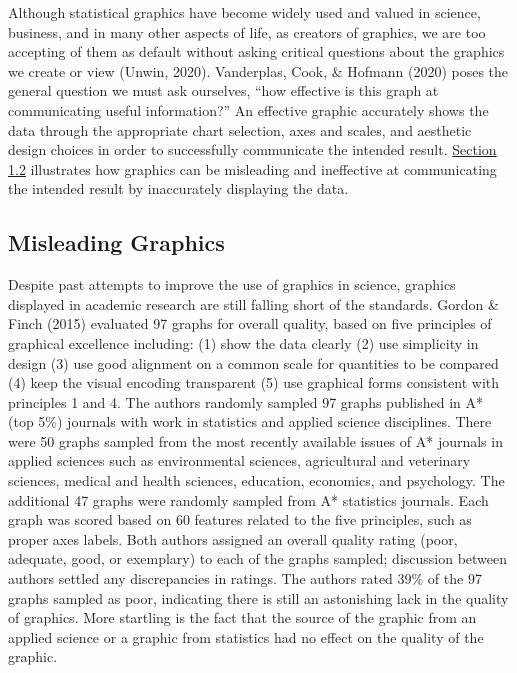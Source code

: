 \documentclass[print]{nuthesis}
\begin{document}
Although statistical graphics have become widely used and valued in science, business, and in many other aspects of life, as creators of graphics, we are too accepting of them as default without asking critical questions about the graphics we create or view (Unwin, 2020). 
Vanderplas, Cook, \& Hofmann (2020) poses the general question we must ask ourselves, ``how effective is this graph at communicating useful information?''
An effective graphic accurately shows the data through the appropriate chart selection, axes and scales, and aesthetic design choices in order to successfully communicate the intended result.
\protect\hyperlink{misleading-graphics}{Section 1.2} illustrates how graphics can be misleading and ineffective at communicating the intended result by inaccurately displaying the data.

\hypertarget{misleading-graphics}{%
\subsection{Misleading Graphics}\label{misleading-graphics}}

Despite past attempts to improve the use of graphics in science, graphics displayed in academic research are still falling short of the standards. Gordon \& Finch (2015) evaluated 97 graphs for overall quality, based on five principles of graphical excellence including: (1) show the data clearly (2) use simplicity in design (3) use good alignment on a common scale for quantities to be compared (4) keep the visual encoding transparent (5) use graphical forms consistent with principles 1 and 4.
The authors randomly sampled 97 graphs published in A* (top 5\%) journals with work in statistics and applied science disciplines.
There were 50 graphs sampled from the most recently available issues of A* journals in applied sciences such as environmental sciences, agricultural and veterinary sciences, medical and health sciences, education, economics, and psychology.
The additional 47 graphs were randomly sampled from A* statistics journals.
Each graph was scored based on 60 features related to the five principles, such as proper axes labels.
Both authors assigned an overall quality rating (poor, adequate, good, or exemplary) to each of the graphs sampled; discussion between authors settled any discrepancies in ratings.
The authors rated 39\% of the 97 graphs sampled as poor, indicating there is still an astonishing lack in the quality of graphics.
More startling is the fact that the source of the graphic from an applied science or a graphic from statistics had no effect on the quality of the graphic.
\end{document}
